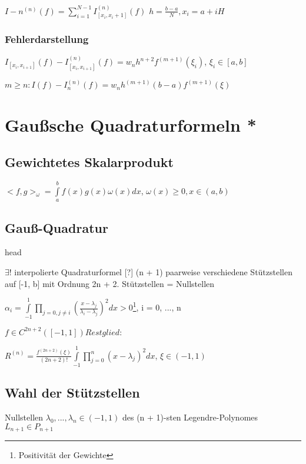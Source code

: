 \documentclass[12pt,a4paper]{article} %
\newcommand*\tab[1][1cm]{\hspace*{#1}}
\begin{document}
	$I-n^{(n)}(f) = \sum\limits_{i = 1}^{N - 1}I_{[x_i, x_i + 1]}^{(n)}(f)$ \tab $h = \frac{b - a}{N}, x_i = a + iH$
	
	\subsubsection{Fehlerdarstellung}
	
	$I_{[x_i, x_{i + 1}]}(f) - I_{[x_i, x_{i + 1}]}^{(n)}(f) = w_nh^{n + 2}f^{(m + 1)}(\xi_i)$, \tab $\xi_i \in [a, b]$
	
	$m \ge n: I(f) - I_n^{(n)}(f) = w_nh^{(m + 1)}(b - a)f^{(m + 1)}(\xi)$
	
	\newpage
	
	\section{Gaußsche Quadraturformeln *}
	
	\subsection{Gewichtetes Skalarprodukt}
	
	$<f, g>_\omega = \int\limits_a^bf(x)g(x)\omega(x)dx$, \tab $\omega(x)\ge 0, x \in (a, b)$
	
	\subsection{Gauß-Quadratur}
	
	head
	
	$\exists!$ interpolierte Quadraturformel [?] (n + 1) paarweise verschiedene Stützstellen auf [-1, b] mit Ordnung 2n + 2. Stützstellen = Nullstellen
	
	$\alpha_i = \int\limits_{-1}^1\prod\limits_{j = 0, j \ne i}(\frac{x - \lambda_j}{\lambda_i - \lambda_j})^2 dx > 0$\footnote{Positivität der Gewichte}, \tab i = 0, ..., n
	
	$f\in C^{2n + 2}([-1, 1]) Restglied:$
		
	$R^{(n)} = \frac{f^{(2n + 2)}(\xi)}{(2n + 2)!}\int\limits_{-1}^1\prod\limits_{j = 0}^n(x - \lambda_j)^2dx$, \tab $\xi \in (-1 , 1)$
		
	\subsection{Wahl der Stützstellen}
	
	Nullstellen $\lambda_0, ..., \lambda_n \in(-1, 1)$ des (n + 1)-sten Legendre-Polynomes $L_{n + 1} \in P_{n + 1}$
	
\end{document}
